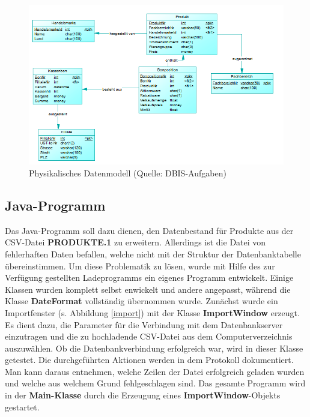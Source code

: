 \begin{figure}[ht!]
  \centering
  \includegraphics[width=1.2\linewidth]{pictures/phys_data.png}
  \caption[Physikalisches Datenmodell]{Physikalisches Datenmodell (Quelle: DBIS-Aufgaben)}
\end{figure}

\subsection{Java-Programm}

Das Java-Programm soll dazu dienen, den Datenbestand für Produkte aus der CSV-Datei \textbf{PRODUKTE.1} zu erweitern. Allerdings ist die Datei von fehlerhaften Daten befallen, welche nicht mit der Struktur der Datenbanktabelle übereinstimmen. Um diese Problematik zu lösen, wurde mit Hilfe des zur Verfügung gestellten Ladeprogramms ein eigenes Programm entwickelt. Einige Klassen wurden komplett selbst enwickelt und andere angepasst, während die Klasse \textbf{DateFormat} vollständig übernommen wurde.
Zunächst wurde ein Importfenster (s. Abbildung \ref{import}) mit der Klasse \textbf{ImportWindow} erzeugt. Es dient dazu, die Parameter für die Verbindung mit dem Datenbankserver einzutragen und die zu hochladende CSV-Datei aus dem Computerverzeichnis auszuwählen. Ob die Datenbankverbindung erfolgreich war, wird in dieser Klasse getestet. Die durchgeführten Aktionen werden in dem Protokoll dokumentiert. Man kann daraus entnehmen, welche Zeilen der Datei erfolgreich geladen wurden und welche aus welchem Grund fehlgeschlagen sind. Das gesamte Programm wird in der \textbf{Main-Klasse} durch die Erzeugung eines \textbf{ImportWindow}-Objekts gestartet.

